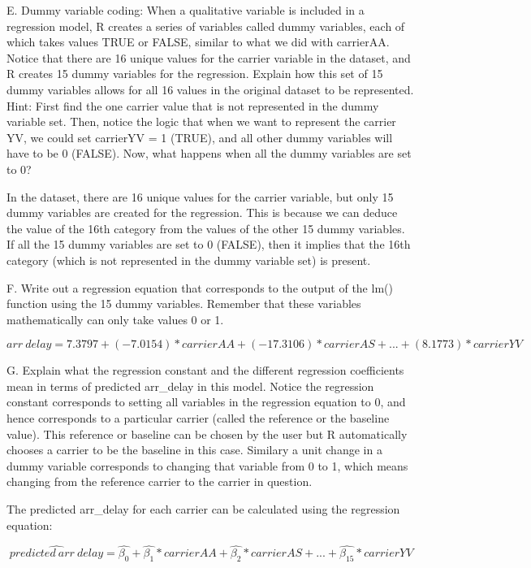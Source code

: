 \documentclass[
]{article}
\begin{document}
E. Dummy variable coding: When a qualitative variable is included in a
regression model, R creates a series of variables called dummy
variables, each of which takes values TRUE or FALSE, similar to what we
did with carrierAA. Notice that there are 16 unique values for the
carrier variable in the dataset, and R creates 15 dummy variables for
the regression. Explain how this set of 15 dummy variables allows for
all 16 values in the original dataset to be represented. Hint: First
find the one carrier value that is not represented in the dummy variable
set. Then, notice the logic that when we want to represent the carrier
YV, we could set carrierYV = 1 (TRUE), and all other dummy variables
will have to be 0 (FALSE). Now, what happens when all the dummy
variables are set to 0?

In the dataset, there are 16 unique values for the carrier variable, but
only 15 dummy variables are created for the regression. This is because
we can deduce the value of the 16th category from the values of the
other 15 dummy variables. If all the 15 dummy variables are set to 0
(FALSE), then it implies that the 16th category (which is not
represented in the dummy variable set) is present.

F. Write out a regression equation that corresponds to the output of the
lm() function using the 15 dummy variables. Remember that these
variables mathematically can only take values 0 or 1.

\[
arr\ delay = 7.3797 + (-7.0154)  * carrierAA + (-17.3106) * carrierAS + ... + (8.1773) * carrierYV
\]

G. Explain what the regression constant and the different regression
coefficients mean in terms of predicted arr\_delay in this model. Notice
the regression constant corresponds to setting all variables in the
regression equation to 0, and hence corresponds to a particular carrier
(called the reference or the baseline value). This reference or baseline
can be chosen by the user but R automatically chooses a carrier to be
the baseline in this case. Similary a unit change in a dummy variable
corresponds to changing that variable from 0 to 1, which means changing
from the reference carrier to the carrier in question.

The predicted arr\_delay for each carrier can be calculated using the
regression equation:

\[
\hat{predicted\ arr\ delay} = \hat{\beta_{0}} + \hat{\beta_{1}} * carrierAA + \hat{\beta_{2}} * carrierAS + ... + \hat{\beta_{15}} * carrierYV
\]
\end{document}

